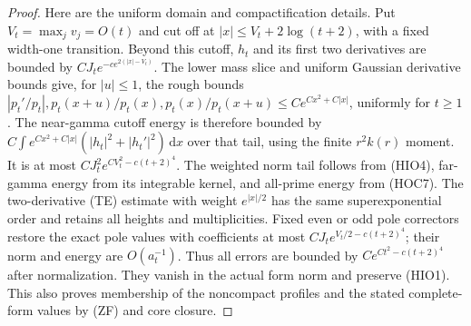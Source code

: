 \documentclass[11pt]{article}
\theoremstyle{remark}\newtheorem{remark}[theorem]{Remark}
\newcommand{\dd}{\,\mathrm d}
\begin{document}
\begin{proof}
Here are the uniform domain and compactification details.
Put $V_t=\max_jv_j=O(t)$ and cut off at
$|x|\le V_t+2\log(t+2)$, with a fixed width-one transition.
Beyond this cutoff, $h_t$ and its first two derivatives are bounded
by $CJ_te^{-ce^{2(|x|-V_t)}}$. The lower mass slice and uniform
Gaussian derivative bounds give, for $|u|\le1$, the rough bounds
$|p_t'/p_t|,p_t(x+u)/p_t(x),p_t(x)/p_t(x+u)
\le Ce^{Cx^2+C|x|}$, uniformly for $t\ge1$.
The near-gamma cutoff energy is therefore bounded by
$C\int e^{Cx^2+C|x|}(|h_t|^2+|h_t'|^2)\dd x$ over that tail,
using the finite $r^2k(r)$ moment. It is at most
$CJ_t^2e^{CV_t^2-c(t+2)^4}$. The weighted norm tail follows
from (HIO4), far-gamma energy from its integrable kernel,
and all-prime energy from (HOC7). The two-derivative (TE) estimate
with weight $e^{|x|/2}$ has the same superexponential order and
retains all heights and multiplicities. Fixed even or odd pole
correctors restore the exact pole values with coefficients at most
$CJ_te^{V_t/2-c(t+2)^4}$; their norm and energy are $O(a_t^{-1})$.
Thus all errors are bounded by $Ce^{Ct^2-c(t+2)^4}$ after normalization.
They vanish in the actual form norm and preserve (HIO1).
This also proves membership of the noncompact profiles and the
stated complete-form values by (ZF) and core closure.
\end{proof}
\end{document}
